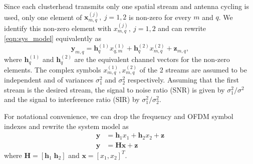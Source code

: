 \documentclass[a4paper,twocolumn,journal]{IEEEtran}
\begin{document}
Since each clusterhead transmits only one spatial stream and antenna cycling is used, only one element of  $\textbf{x}^{(j)}_{m,q},~j=1,2$ is non-zero for every $m$ and $q$. We identify this non-zero element with  $x^{(j)}_{m,q},~j=1,2$ and can rewrite \eqref{eqn:sys_model} equivalently as 
\begin{equation}\label{eq:cellularfreq}
\textbf{y}_{m,q}\!=\!\textbf{h}^{(1)}_{q}x^{(1)}_{q,m}+\textbf{h}^{(2)}_{q}x^{(2)}_{m,q}+\textbf{z}_{m,q},
\end{equation}
where $\textbf{h}^{(1)}_{q}$ and $\textbf{h}^{(2)}_{q}$ are the equivalent channel vectors for the non-zero elements.  
%	
%
The complex symbols $x^{(1)}_{m,q},x^{(2)}_{m,q}$ of the $2$ streams are assumed to be independent and of variances $\sigma^{2}_{1}$ and $\sigma^{2}_{2}$ respectively. Assuming that the first stream is the desired stream, the signal to noise ratio (SNR) is given by ${\sigma^{2}_{1}}/{\sigma^2}$ and the signal to interference ratio (SIR) by ${\sigma^{2}_{1}}/{\sigma^{2}_{2}}$.


For notational convenience, we can drop the frequency and OFDM symbol indexes and rewrite the system model as
\begin{align}\label{eq:cellularfreq1}
\textbf{y}&=\textbf{h}_{1}x_{1}+\textbf{h}_{2}x_{2}+\textbf{z}\nonumber\\
\textbf{y}&=\textbf{H}\textbf{x}+\textbf{z}\nonumber
\end{align}
where $\textbf{H}=\left[\textbf{h}_{1}\;\textbf{h}_{2}\right]$ and $\textbf{x}=\left[x_{1},x_{2}\right]^{T}$.
\end{document}
